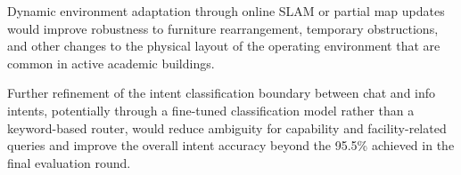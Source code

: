 Dynamic environment adaptation through online SLAM or partial map updates would improve robustness to furniture rearrangement, temporary obstructions, and other changes to the physical layout of the operating environment that are common in active academic buildings.

Further refinement of the intent classification boundary between chat and info intents, potentially through a fine-tuned classification model rather than a keyword-based router, would reduce ambiguity for capability and facility-related queries and improve the overall intent accuracy beyond the 95.5\% achieved in the final evaluation round.




